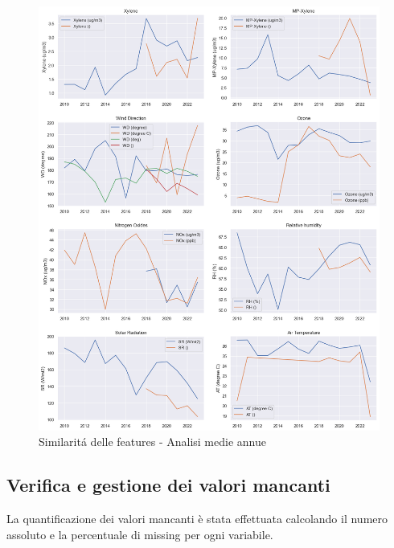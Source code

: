 \documentclass[a4paper,12pt]{report}
\begin{document}
	\begin{figure}[H]
		\centering
		\includegraphics[width=1.0\textwidth]{img/feat_red_pm.png}
		\caption{Similaritá delle features - Analisi medie annue}
	\end{figure}
	
	\subsection{Verifica e gestione dei valori mancanti}
	La quantificazione dei valori mancanti è stata effettuata calcolando il numero assoluto e la percentuale di missing per ogni variabile.
	
\end{document}
